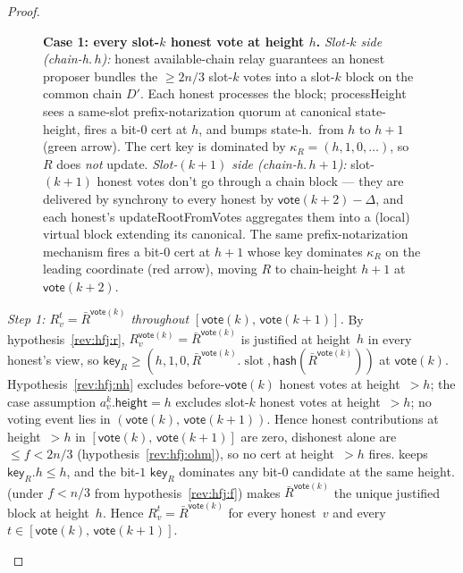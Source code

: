\ifx\litemode\undefined\documentclass{article}\fi
\newcommand{\slot}[0]{\ensuremath{\operatorname{\mathrm{slot}}}}
\newcommand{\height}{\mathsf{height}}
\newcommand{\hash}{\mathsf{hash}}
\newcommand{\key}{\mathsf{key}}
\newcommand{\vote}{\mathsf{vote}}
\newcommand{\comm}[1]{\bar{#1}}
\newcommand{\processHeight}{\textsf{processHeight}\xspace}
\newcommand{\updateRootFromVotes}{\textsf{updateRootFromVotes}\xspace}
\theoremstyle{plain}
\theoremstyle{definition}
\theoremstyle{remark}
\newcommand{\HAR}{honest available-chain relay\xspace}
\begin{document}
\begin{proof}
\begin{description}
\begin{figure}[H]
\begin{tikzpicture}
\end{tikzpicture}
\caption{\label{rev:fig:hfj-case1}\textbf{Case 1: every slot-$k$ honest vote at height $h$.}
\emph{Slot-$k$ side (chain-h.\,$h$):} \HAR{} guarantees an honest proposer bundles the $\geq 2n/3$ slot-$k$ votes into a slot-$k$ block on the common chain $D'$. Each honest processes the block; \processHeight{} sees a same-slot prefix-notarization quorum at canonical state-height, fires a bit-$0$ cert at $h$, and bumps state-h.\ from $h$ to $h+1$ (green arrow). The cert key is dominated by $\kappa_R = (h, 1, 0, \ldots)$, so $R$ does \emph{not} update.
\emph{Slot-$(k+1)$ side (chain-h.\,$h+1$):} slot-$(k+1)$ honest votes don't go through a chain block — they are delivered by synchrony to every honest by $\vote(k+2) - \Delta$, and each honest's \updateRootFromVotes{} aggregates them into a (local) virtual block extending its canonical. The same prefix-notarization mechanism fires a bit-$0$ cert at $h+1$ whose key dominates $\kappa_R$ on the leading coordinate (red arrow), moving $R$ to chain-height $h+1$ at $\vote(k+2)$.}
\end{figure}

\emph{Step 1: $R_v^t = \comm{R}^{\vote(k)}$ throughout $[\vote(k),\, \vote(k+1)]$.}
By hypothesis~\ref{rev:hfj:r}, $R_v^{\vote(k)} = \comm{R}^{\vote(k)}$ is justified at height~$h$ in every honest's view, so $\key_R \geq (h, 1, 0, \comm{R}^{\vote(k)}.\slot, \hash(\comm{R}^{\vote(k)}))$ at $\vote(k)$. Hypothesis~\ref{rev:hfj:nh} excludes before-$\vote(k)$ honest votes at height~$>h$; the case assumption $a^k_v.\height = h$ excludes slot-$k$ honest votes at height~$>h$; no voting event lies in $(\vote(k),\, \vote(k+1))$. Hence honest contributions at height~$>h$ in $[\vote(k),\, \vote(k+1)]$ are zero, dishonest alone are $\leq f < 2n/3$ (hypothesis~\ref{rev:hfj:ohm}), so no cert at height~$>h$ fires.  keeps $\key_R.h \leq h$, and the bit-$1$ $\key_R$ dominates any bit-$0$ candidate at the same height.  (under $f < n/3$ from hypothesis~\ref{rev:hfj:f}) makes $\comm{R}^{\vote(k)}$ the unique justified block at height~$h$. Hence $R_v^t = \comm{R}^{\vote(k)}$ for every honest~$v$ and every $t \in [\vote(k),\, \vote(k+1)]$.


\end{description}
\end{proof}
\end{document}
